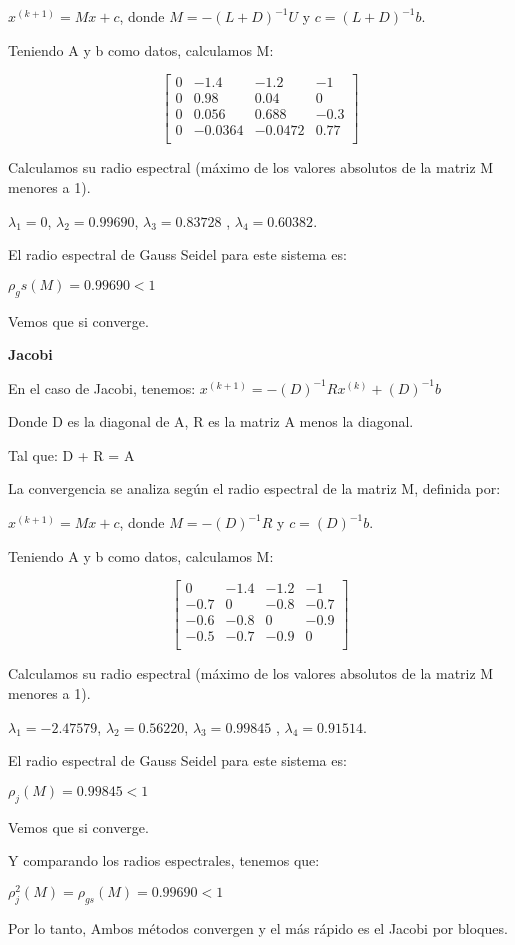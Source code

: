$x^{(k+1)}=Mx + c$, donde $M=-(L+D)^{-1} U$ y $c=(L+D)^{-1} b$.

Teniendo A y b como datos, calculamos M:
\begin{center}
\[
\begin{bmatrix}
    0 & -1.4 & -1.2 & -1 \\
    0 & 0.98 & 0.04 & 0 \\
    0 &  0.056 & 0.688 & -0.3 \\
    0 & -0.0364 & -0.0472 & 0.77 \\
\end{bmatrix}
\]    
\end{center}

Calculamos su radio espectral (máximo de los valores absolutos de la matriz M menores a 1).

$\lambda_1 =0$, $\lambda_2 = 0.99690$, $\lambda_3 = 0.83728$ , $\lambda_4 = 0.60382$.

El radio espectral de Gauss Seidel para este sistema es:
\begin{center}
    $\rho_gs (M) = 0.99690 < 1$
\end{center}

Vemos que si converge.

\textbf{Jacobi}

En el caso de Jacobi, tenemos:
$x^{(k+1)}={-(D)}^{-1}{R}x^{(k)}+{(D)}^{-1}b$

Donde D es la diagonal de A, R es la matriz A menos la diagonal.

Tal que: D + R = A

La convergencia se analiza según el radio espectral de la matriz M, definida por:

$x^{(k+1)}=Mx + c$, donde $M=-(D)^{-1} R$ y $c=(D)^{-1} b$.

Teniendo A y b como datos, calculamos M:
\begin{center}
\[
\begin{bmatrix}
    0 & -1.4 & -1.2 & -1 \\
    -0.7 & 0 & -0.8 & -0.7 \\
    -0.6 &  -0.8 & 0 & -0.9 \\
    -0.5 & -0.7 & -0.9 & 0 \\
\end{bmatrix}
\]    
\end{center}

Calculamos su radio espectral (máximo de los valores absolutos de la matriz M menores a 1).

$\lambda_1 = -2.47579$, $\lambda_2 = 0.56220$, $\lambda_3 = 0.99845$ , $\lambda_4 = 0.91514$.

El radio espectral de Gauss Seidel para este sistema es:
\begin{center}
    $\rho_j (M) = 0.99845 < 1$
\end{center}

Vemos que si converge.

Y comparando los radios espectrales, tenemos que:

\begin{center}
    $\rho_j ^ 2 (M) = \rho_{gs} (M) = 0.99690 < 1$
\end{center}

Por lo tanto, Ambos métodos convergen y el más rápido es el Jacobi por bloques.
